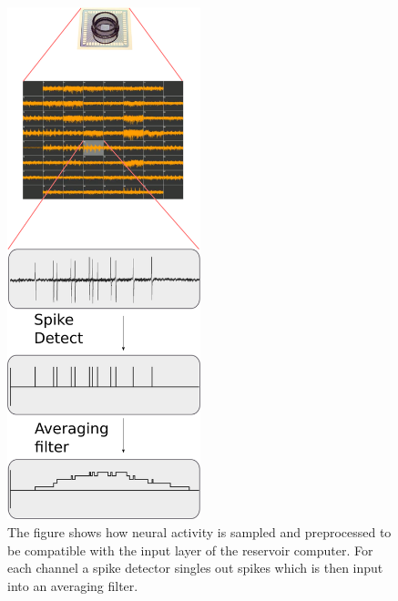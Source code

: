 \begin{figure}[h]
  \centering
  \includegraphics[width=0.5\textwidth]{fig/system4.png}
  \caption{
    The figure shows how neural activity is sampled and preprocessed to
    be compatible with the input layer of the reservoir computer.
    For each channel a spike detector singles out spikes which is then input
    into an averaging filter.
  }
  \label{figOverview}
\end{figure}
